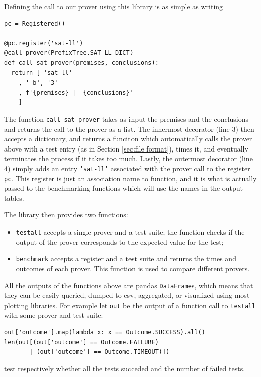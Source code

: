 Defining the call to our prover using this library is as simple as writing
\begin{verbatim}
pc = Registered()

@pc.register('sat-ll')
@call_prover(PrefixTree.SAT_LL_DICT)
def call_sat_prover(premises, conclusions):
  return [ 'sat-ll'
    , '-b', '3'
    , f'{premises} |- {conclusions}'
    ]
\end{verbatim}
The function \texttt{call\_sat\_prover} takes as input the premises and the conclusions and returns the call to the prover as a list.
The innermost decorator (line 3) then accepts a dictionary, and returns a funciton which automatically calls the prover above with a test entry (as in Section \ref{sec:file format}), times it, and eventually terminates the process if it takes too much.
Lastly, the outermost decorator (line 4) simply adds an entry \texttt{'sat-ll'} associated with the prover call to the register \texttt{pc}.
This register is just an association name to function, and it is what is actually passed to the benchmarking functions which will use the names in the output tables.

The library then provides two functions:
\begin{itemize}
	\item \texttt{testall} accepts a single prover and a test suite; the function checks if the output of the prover corresponds to the expected value for the test;
	\item \texttt{benchmark} accepts a register and a test suite and returns the times and outcomes of each prover.
		This function is used to compare different provers.
\end{itemize}
All the outputs of the functions above are pandas \texttt{DataFrame}s, which means that they can be easily queried, dumped to csv, aggregated, or visualized using most plotting libraries.
For example let \texttt{out} be the output of a function call to \texttt{testall} with some prover and test suite:
\begin{verbatim}
out['outcome'].map(lambda x: x == Outcome.SUCCESS).all()
len(out[(out['outcome'] == Outcome.FAILURE) 
       | (out['outcome'] == Outcome.TIMEOUT)])
\end{verbatim}
test respectively whether all the tests succeded and the number of failed tests.

